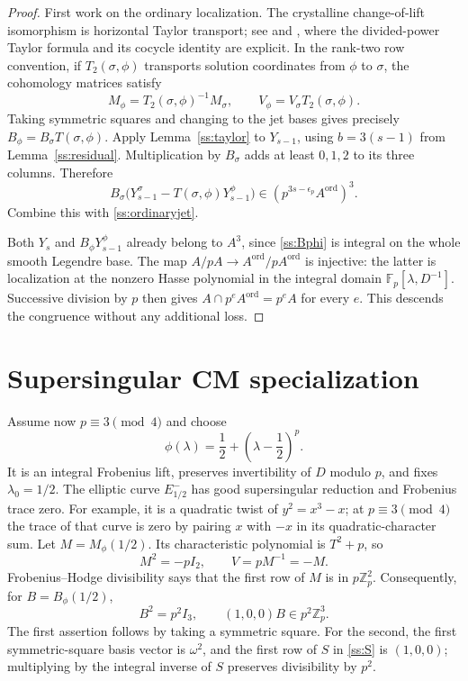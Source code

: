 \documentclass[11pt,a4paper]{article}
\begin{document}
\begin{proof}
First work on the ordinary localization.  The crystalline
change-of-lift isomorphism is horizontal Taylor transport; see
\cite[\S2.1, pp.~19--20]{BM} and
\cite[Proposition~60.17.4, Tag~07JH]{Stacks}, where the divided-power
Taylor formula and its cocycle identity are explicit.
In the rank-two row convention, if $T_2(\sigma,\phi)$ transports
solution coordinates from $\phi$ to $\sigma$, the cohomology matrices
satisfy
\[
 M_\phi=T_2(\sigma,\phi)^{-1}M_\sigma,
 \qquad V_\phi=V_\sigma T_2(\sigma,\phi).
\]
Taking symmetric squares and changing to the jet bases gives precisely
$B_\phi=B_\sigma T(\sigma,\phi)$.
Apply Lemma~\ref{ss:taylor} to $Y_{s-1}$, using
$b=3(s-1)$ from Lemma~\ref{ss:residual}.  Multiplication by
$B_\sigma$ adds at least $0,1,2$ to its three columns.  Therefore
\[
 B_\sigma\bigl(Y_{s-1}^\sigma-
                    T(\sigma,\phi)Y_{s-1}^\phi\bigr)
                \in(p^{3s-\epsilon_p}A^{\mathrm{ord}})^3.
\]
Combine this with \eqref{ss:ordinaryjet}.

Both $Y_s$ and $B_\phi Y_{s-1}^\phi$ already belong to $A^3$, since
\eqref{ss:Bphi} is integral on the whole smooth Legendre base.
The map $A/pA\to A^{\mathrm{ord}}/pA^{\mathrm{ord}}$ is injective:
the latter is localization at the nonzero Hasse polynomial in the
integral domain $\mathbb F_p[\lambda,D^{-1}]$.
Successive division by $p$ then gives
$A\cap p^eA^{\mathrm{ord}}=p^eA$ for every $e$.
This descends the congruence without any additional loss.
\end{proof}

\section{Supersingular CM specialization}\label{sec:sscm}

Assume now $p\equiv3\pmod4$ and choose
\[
 \phi(\lambda)=\frac12+\left(\lambda-\frac12\right)^p.
\]
It is an integral Frobenius lift, preserves invertibility of $D$
modulo $p$, and fixes $\lambda_0=1/2$.
The elliptic curve $E^-_{1/2}$ has good supersingular reduction and
Frobenius trace zero.  For example, it is a quadratic twist of
$y^2=x^3-x$; at $p\equiv3\pmod4$ the trace of that curve is zero by
pairing $x$ with $-x$ in its quadratic-character sum.
Let $M=M_\phi(1/2)$.  Its characteristic polynomial is $T^2+p$, so
\[
 M^2=-pI_2,\qquad V=pM^{-1}=-M.
\]
Frobenius--Hodge divisibility says that the first row of $M$ is in
$p\mathbb Z_p^2$.  Consequently, for $B=B_\phi(1/2)$,
\begin{equation}\label{ss:CMmatrix}
 B^2=p^2I_3,\qquad (1,0,0)B\in p^2\mathbb Z_p^3.
\end{equation}
The first assertion follows by taking a symmetric square.  For the
second, the first symmetric-square basis vector is $\omega^2$, and the
first row of $S$ in \eqref{ss:S} is $(1,0,0)$; multiplying by the integral
inverse of $S$ preserves divisibility by $p^2$.
\end{document}
